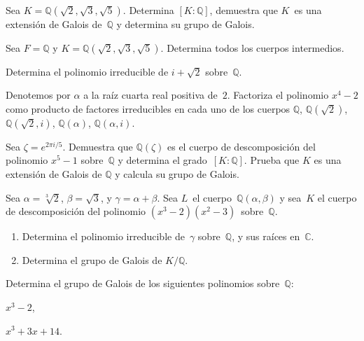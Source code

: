 \documentclass[12pt]{article}
\begin{document}
    
    \begin{exercise}[16.6.2]
        Sea $K=\mathbb{Q}(\sqrt{2}, \sqrt{3}, \sqrt{5})$. Determina $[K:\mathbb{Q}]$, demuestra que $K$~es una extensión de Galois de~$\mathbb{Q}$ y determina su grupo de Galois.
    \end{exercise}
    
    \begin{exercise}[16.7.4]
        Sea $F=\mathbb{Q}$ y  $K=\mathbb{Q}(\sqrt{2}, \sqrt{3}, \sqrt{5})$. Determina todos los cuerpos intermedios.
    \end{exercise}
    
    \begin{exercise}[16.7.7.a]
        Determina el polinomio irreducible de $i+\sqrt{2}$ sobre~$\mathbb{Q}$.
    \end{exercise}
    
    \begin{exercise}[16.7.8]
        Denotemos por $\alpha$ a la raíz cuarta real positiva de~$2$. Factoriza el polinomio $x^{4}-2$ como producto de factores irreducibles en cada uno de los cuerpos $\mathbb{Q}$, $\mathbb{Q}(\sqrt{2})$, $\mathbb{Q}(\sqrt{2},i)$, $\mathbb{Q}(\alpha)$, $\mathbb{Q}(\alpha,i)$.
    \end{exercise}
    
    
    \begin{exercise}[16.7.9]
        Sea $\zeta=e^{2\pi i/5}$. Demuestra que $\mathbb{Q}(\zeta)$ es el cuerpo de descomposición del polinomio $x^{5}-1$ sobre~$\mathbb{Q}$ y determina el grado~$[K:\mathbb{Q}]$. Prueba que $K$ es una extensión de Galois de $\mathbb{Q}$ y calcula su grupo de Galois.
    \end{exercise}
    
    \begin{exercise}[16.7.11]
        Sea $\alpha=\sqrt[3]{2}$, $\beta=\sqrt{3}$, y $\gamma=\alpha+\beta$. Sea $L$~el cuerpo~$\mathbb{Q}(\alpha,\beta)$ y sea~$K$ el cuerpo de descomposición del polinomio $(x^{3}-2)(x^{2}-3)$~sobre~$\mathbb{Q}$.
        \begin{enumerate}[\bfseries(a)]
            \item Determina el polinomio irreducible de~$\gamma$ sobre~$\mathbb{Q}$, y sus raíces en~$\mathbb{C}$.
            \item Determina el grupo de Galois de $K/\mathbb{Q}$.
        \end{enumerate}
    \end{exercise}
    
    
    \begin{exercise}[16.8.2]
        Determina el grupo de Galois de los siguientes polinomios sobre~$\mathbb{Q}$:
        
        \noindent
        \begin{inparaenum}[\bfseries(a)]
            \item $x^{3}-2$,
            \item $x^{3}+3x+14$.
        \end{inparaenum}
    \end{exercise}
    
\end{document}
